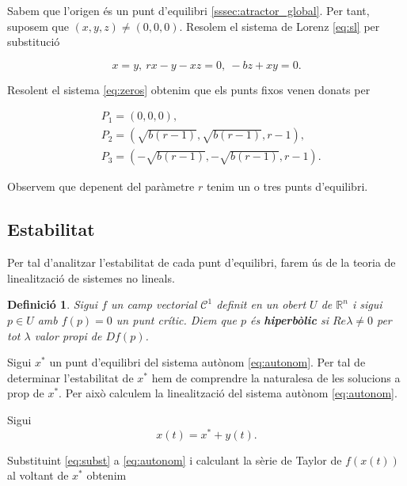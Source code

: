 \documentclass[11pt,a4paper,openright,oneside]{article}
\numberwithin{equation}{section}
\newtheorem{defi}[teo]{Definici\'o}
\theoremstyle{definition}
\begin{document}
Sabem que l'origen és un punt d'equilibri \ref{sssec:atractor_global}. Per tant, suposem que $(x,y,z)\neq(0,0,0)$. Resolem el sistema de Lorenz \eqref{eq:sl} per substitució
    
\begin{equation} \label{eq:zeros}
     x = y, \ rx-y-xz = 0, \ -bz+xy = 0. 
\end{equation}

Resolent el sistema \eqref{eq:zeros} obtenim que els punts fixos venen donats per 

\begin{equation} \begin{aligned} \label{eq:Punts equilibri}
    &P_1=\left(0,0,0\right),\\
    &P_2=\left(\sqrt{b(r-1)},\sqrt{b(r-1)},r-1\right),\\
    &P_3 = \left(-\sqrt{b(r-1)}, -\sqrt{b(r-1)}, r-1\right).
\end{aligned} \end{equation}

Observem que depenent del paràmetre $r$ tenim un o tres punts d'equilibri.   

\subsection*{Estabilitat} \label{subsection: estabilitat}  

Per tal d'analitzar l'estabilitat de cada punt d'equilibri, farem ús de la teoria de linealització de sistemes no lineals.

\begin{defi} \label{defi: hiperbolic}
    Sigui $f$ un camp vectorial $\mathcal{C}^{1}$ definit en un obert $U$ de $\mathbb{R}^{n}$ i sigui $p \in U $ amb $f(p)=0$ un punt crític. Diem que $p$ és \textbf{hiperbòlic} si $Re \lambda \neq 0$ per tot $\lambda$ valor propi de $Df(p)$. 
\end{defi}

Sigui $x^{*}$ un punt d'equilibri del sistema autònom \eqref{eq:autonom}. Per tal de determinar l'estabilitat de $x^{*}$ hem de comprendre la naturalesa de les solucions a prop de $x^{*}$. Per això calculem la linealització del sistema autònom \eqref{eq:autonom}. 

Sigui \begin{equation} \label{eq:subst}
    x(t)=x^{*}+y(t).
\end{equation}

Substituint \eqref{eq:subst} a \eqref{eq:autonom} i calculant la sèrie de Taylor de $f\left(x(t)\right)$ al voltant de $x^*$ obtenim 
\end{document}
